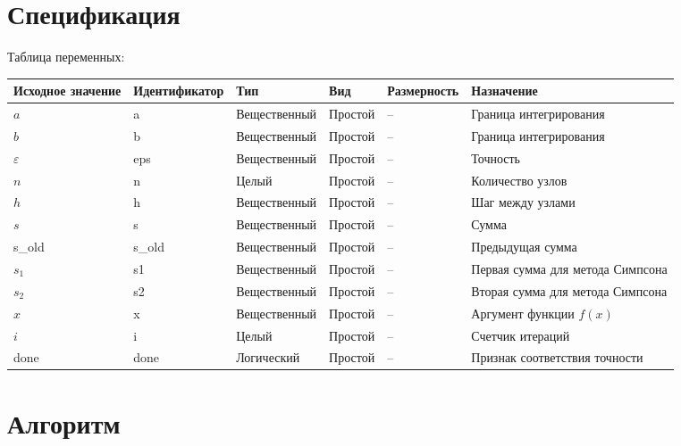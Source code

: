 \documentclass[a4paper]{article}
\begin{document}
\section{Спецификация}
Таблица переменных:
{
\fontsize{10pt}{12pt}\selectfont
\begin{longtable}{|p{1.5cm}|l|p{2.5cm}|l|p{2cm}|p{4.5cm}|}
\hline
Исходное значение & Идентификатор & Тип & Вид & Размерность & Назначение\\
\hline
$a$ & a & Вещественный & Простой & -- & Граница интегрирования\\
\hline
$b$ & b & Вещественный & Простой & -- & Граница интегрирования\\
\hline
$\varepsilon$ & eps & Вещественный & Простой & -- & Точность\\
\hline
$n$ & n & Целый & Простой & -- & Количество узлов\\
\hline
$h$ & h & Вещественный & Простой & -- & Шаг между узлами\\
\hline
$s$ & s & Вещественный & Простой & -- & Сумма\\
\hline
s\_old & s\_old & Вещественный & Простой & -- & Предыдущая сумма\\
\hline
$s_1$ & s1 & Вещественный & Простой & -- & Первая сумма для метода Симпсона\\
\hline
$s_2$ & s2 & Вещественный & Простой & -- & Вторая сумма для метода Симпсона\\
\hline
$x$ & x & Вещественный & Простой & -- & Аргумент функции $f(x)$\\
\hline
$i$ & i & Целый & Простой & -- & Счетчик итераций\\
\hline
done & done & Логический & Простой & -- & Признак соответствия точности\\
\hline
\end{longtable}
}

\newpage
\section{Алгоритм}
\end{document}
